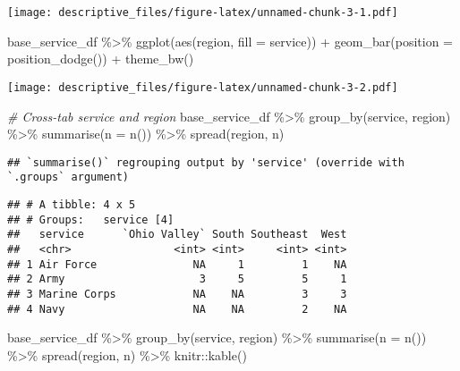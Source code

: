 \documentclass[
]{article}
\newenvironment{Shaded}{\begin{snugshade}}{\end{snugshade}}
\newcommand{\AttributeTok}[1]{\textcolor[rgb]{0.77,0.63,0.00}{#1}}
\newcommand{\CommentTok}[1]{\textcolor[rgb]{0.56,0.35,0.01}{\textit{#1}}}
\newcommand{\FunctionTok}[1]{\textcolor[rgb]{0.00,0.00,0.00}{#1}}
\newcommand{\NormalTok}[1]{#1}
\newcommand{\SpecialCharTok}[1]{\textcolor[rgb]{0.00,0.00,0.00}{#1}}
\begin{document}
\texttt{[image: descriptive\_files/figure-latex/unnamed-chunk-3-1.pdf]}

\begin{Shaded}
\begin{Highlighting}[]
\NormalTok{base\_service\_df }\SpecialCharTok{\%\textgreater{}\%} 
  \FunctionTok{ggplot}\NormalTok{(}\FunctionTok{aes}\NormalTok{(region, }\AttributeTok{fill =}\NormalTok{ service)) }\SpecialCharTok{+}
    \FunctionTok{geom\_bar}\NormalTok{(}\AttributeTok{position =} \FunctionTok{position\_dodge}\NormalTok{()) }\SpecialCharTok{+}
    \FunctionTok{theme\_bw}\NormalTok{()}
\end{Highlighting}
\end{Shaded}

\texttt{[image: descriptive\_files/figure-latex/unnamed-chunk-3-2.pdf]}

\begin{Shaded}
\begin{Highlighting}[]
\CommentTok{\# Cross{-}tab service and region}
\NormalTok{base\_service\_df }\SpecialCharTok{\%\textgreater{}\%} 
  \FunctionTok{group\_by}\NormalTok{(service, region) }\SpecialCharTok{\%\textgreater{}\%} 
  \FunctionTok{summarise}\NormalTok{(}\AttributeTok{n =} \FunctionTok{n}\NormalTok{()) }\SpecialCharTok{\%\textgreater{}\%} 
  \FunctionTok{spread}\NormalTok{(region, n)}
\end{Highlighting}
\end{Shaded}

\begin{verbatim}
## `summarise()` regrouping output by 'service' (override with `.groups` argument)
\end{verbatim}

\begin{verbatim}
## # A tibble: 4 x 5
## # Groups:   service [4]
##   service      `Ohio Valley` South Southeast  West
##   <chr>                <int> <int>     <int> <int>
## 1 Air Force               NA     1         1    NA
## 2 Army                     3     5         5     1
## 3 Marine Corps            NA    NA         3     3
## 4 Navy                    NA    NA         2    NA
\end{verbatim}

\begin{Shaded}
\begin{Highlighting}[]
\NormalTok{base\_service\_df }\SpecialCharTok{\%\textgreater{}\%} 
  \FunctionTok{group\_by}\NormalTok{(service, region) }\SpecialCharTok{\%\textgreater{}\%} 
  \FunctionTok{summarise}\NormalTok{(}\AttributeTok{n =} \FunctionTok{n}\NormalTok{()) }\SpecialCharTok{\%\textgreater{}\%} 
  \FunctionTok{spread}\NormalTok{(region, n) }\SpecialCharTok{\%\textgreater{}\%} 
\NormalTok{  knitr}\SpecialCharTok{::}\FunctionTok{kable}\NormalTok{()}
\end{Highlighting}
\end{Shaded}
\end{document}

